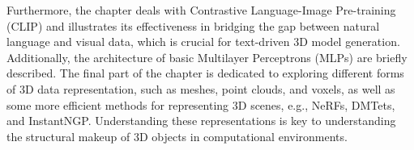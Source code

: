 Furthermore, the chapter deals with Contrastive Language-Image Pre-training (CLIP) \citep{radfordCLIP} and illustrates its effectiveness in bridging the gap between natural language and visual data, which is crucial for text-driven 3D model generation. Additionally, the architecture of basic Multilayer Perceptrons (MLPs) are briefly described. The final part of the chapter is dedicated to exploring different forms of 3D data representation, such as meshes, point clouds, and voxels, as well as some more efficient methods for representing 3D scenes, e.g., NeRFs, DMTets, and InstantNGP\@. Understanding these representations is key to understanding the structural makeup of 3D objects in computational environments.








